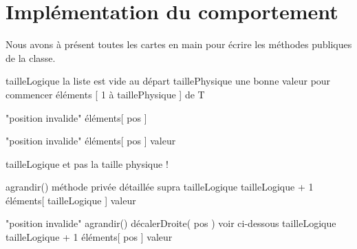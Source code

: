 \section{Implémentation du comportement}

Nous avons à présent toutes les cartes en main pour écrire les méthodes
publiques de la classe.

\begin{Pseudocode}
		\Let tailleLogique 
		\RComment la liste est vide au départ
		\Let taillePhysique 
		\RComment une bonne valeur pour commencer
		\Let éléments \Gets {}  [ 1 à taillePhysique ] de T
	\EndConstr
\end{Pseudocode}

\begin{Pseudocode}
			\Error "position invalide"
		\EndIf
		\Return éléments[ pos ]
	\EndMethod
\end{Pseudocode}

\begin{Pseudocode}
			\Error "position invalide"
		\EndIf
		\Let éléments[ pos ] \Gets valeur
	\EndMethod
\end{Pseudocode}

\begin{Pseudocode}
		\Return tailleLogique
		\RComment et pas la taille physique !
	\EndMethod
\end{Pseudocode}

\begin{Pseudocode}
			\Stmt agrandir()
			\RComment méthode privée détaillée supra
		\EndIf
		\Let tailleLogique \Gets tailleLogique + 1
		\Let éléments[ tailleLogique ] \Gets valeur
	\EndMethod
\end{Pseudocode}

\begin{Pseudocode}
			\Error "position invalide"
		\EndIf
			\Stmt agrandir()
		\EndIf
		\Stmt décalerDroite( pos )
		\RComment voir ci-dessous
		\Let tailleLogique \Gets tailleLogique + 1
		\Let éléments[ pos ] \Gets valeur
	\EndMethod
\end{Pseudocode}


